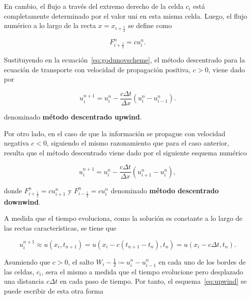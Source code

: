 En cambio, el flujo a través del extremo derecho de la celda $c_{i}$
está completamente determinado por el valor uni en esta misma celda.
Luego, el flujo numérico a lo largo de la recta $x=x_{i+\frac{1}{2}}$
se define como

\begin{equation*}
  F^{n}_{i+\frac{1}{2}}=
  cu^{n}_{i}.
\end{equation*}

Sustituyendo en la ecuación~\eqref{eq:godunovscheme}, el método
descentrado para la ecuación de transporte con velocidad de
propagación positiva, $c>0$, viene dado por

\begin{equation}\label{eq:upwind}
  u^{n+1}_{i}=
  u^{n}_{i}-
  \frac{c\Delta t}{\Delta x}
  \left(
  u^{n}_{i}-
  u^{n}_{i-1}
  \right).
\end{equation}

denominado \textbf{método descentrado upwind}.

Por otro lado, en el caso de que la información se propague con
velocidad negativa $c<0$, %
siguiendo el mismo razonamiento que para el caso anterior, resulta
que el método descentrado viene dado por el siguiente esquema
numérico

\begin{equation}\label{eq:downwind}
  u^{n+1}_{i}=
  u^{n}_{i}-
  \frac{c\Delta t}{\Delta x}
  \left(
  u^{n}_{i+1}-
  u^{n}_{i}
  \right),
\end{equation}

donde
\begin{math}
  F^{n}_{i+\frac{1}{2}}=
  cu^{n}_{i+1}
\end{math}
y
\begin{math}
  F^{n}_{i-\frac{1}{2}}=
  cu^{n}_{i}
\end{math}
denominado \textbf{método descentrado downwind}.

A medida que el tiempo evoluciona, como la solución es constante a lo
largo de las rectas características, se tiene que

\begin{equation*}
  u^{n+1}_{i}\approx
  u
  \left(x_{i},t_{n+1}\right)=
  u
  \left(
  x_{i}-
  c\left(t_{n+1}-t_{n}\right),
  t_{n}
  \right)=
  u
  \left(
  x_{i}-
  c\Delta t,t_{n}
  \right).
\end{equation*}

Asumiendo que $c>0$, el salto
\begin{math}
  W_{i}-\frac{1}{2}\coloneqq
  u^{n}_{i}-
  u_{i-1}^{n}
\end{math}
en cada uno de los bordes de las celdas, $c_{i}$, sera el mismo a
medida que el tiempo evolucione pero desplazado una distancia
$c\Delta t$ en cada paso de tiempo.
Por tanto, el esquema~\eqref{eq:upwind} se puede escribir de esta
otra forma

